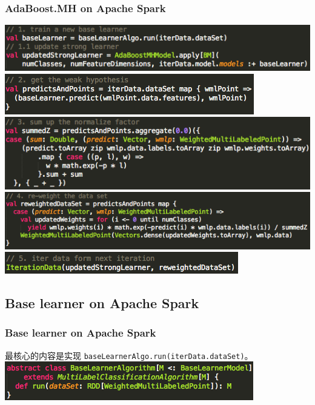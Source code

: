 \documentclass{beamer}
\begin{document}
\begin{frame}
\frametitle{AdaBoost.MH on Apache Spark}
\includegraphics[scale=0.5,left]{img/a1_train_base.png} \\
\includegraphics[scale=0.5,left]{img/a2_hypoth.png} \\
\includegraphics[scale=0.5,left]{img/a3_sumz.png} \\
\includegraphics[scale=0.5,left]{img/a4_reweighting.png} \\
\includegraphics[scale=0.5,left]{img/a5_nextiter.png} 
\end{frame}

\subsection{Base learner on Apache Spark}

\begin{frame}
\frametitle{Base learner on Apache Spark}
最核心的内容是实现 \texttt{baseLearnerAlgo.run(iterData.dataSet)}。 \\
\includegraphics[scale=0.5,left]{img/base_algo.png}
\end{frame}
\end{document}
